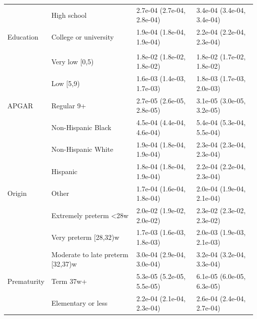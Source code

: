 \documentclass[10pt, twoside, parskip=half]{article}
\begin{document}
\begin{table}[t]
\begin{tabular}{llll}
 & High school & 2.7e-04 (2.7e-04, 2.8e-04) & 3.4e-04 (3.4e-04, 3.4e-04)\\

\multirow{-3}{*}{\raggedright\arraybackslash \hspace{1em}Education} & College or university & 1.9e-04 (1.8e-04, 1.9e-04) & 2.2e-04 (2.2e-04, 2.3e-04)\\
\cmidrule{1-4}
\addlinespace[0.3em]
\multicolumn{4}{l}{\textbf{2000-2005}}\\
 & Very low [0,5) & 1.8e-02 (1.8e-02, 1.8e-02) & 1.8e-02 (1.7e-02, 1.8e-02)\\

 & Low [5,9) & 1.6e-03 (1.4e-03, 1.7e-03) & 1.8e-03 (1.7e-03, 2.0e-03)\\

\multirow{-3}{*}{\raggedright\arraybackslash \hspace{1em}APGAR} & Regular 9+ & 2.7e-05 (2.6e-05, 2.8e-05) & 3.1e-05 (3.0e-05, 3.2e-05)\\
\cmidrule{1-4}
 & Non-Hispanic Black & 4.5e-04 (4.4e-04, 4.6e-04) & 5.4e-04 (5.3e-04, 5.5e-04)\\

 & Non-Hispanic White & 1.9e-04 (1.8e-04, 1.9e-04) & 2.3e-04 (2.3e-04, 2.3e-04)\\

 & Hispanic & 1.8e-04 (1.8e-04, 1.9e-04) & 2.2e-04 (2.2e-04, 2.3e-04)\\

\multirow{-4}{*}{\raggedright\arraybackslash \hspace{1em}Origin} & Other & 1.7e-04 (1.6e-04, 1.8e-04) & 2.0e-04 (1.9e-04, 2.1e-04)\\
\cmidrule{1-4}
 & Extremely preterm <28w & 2.0e-02 (1.9e-02, 2.0e-02) & 2.3e-02 (2.3e-02, 2.3e-02)\\

 & Very preterm [28,32)w & 1.7e-03 (1.6e-03, 1.8e-03) & 2.0e-03 (1.9e-03, 2.1e-03)\\

 & Moderate to late preterm [32,37)w & 3.0e-04 (2.9e-04, 3.0e-04) & 3.2e-04 (3.2e-04, 3.3e-04)\\

\multirow{-4}{*}{\raggedright\arraybackslash \hspace{1em}Prematurity} & Term 37w+ & 5.3e-05 (5.2e-05, 5.5e-05) & 6.1e-05 (6.0e-05, 6.3e-05)\\
\cmidrule{1-4}
 & Elementary or less & 2.2e-04 (2.1e-04, 2.3e-04) & 2.6e-04 (2.4e-04, 2.7e-04)\\


\end{tabular}
\end{table}
\end{document}
